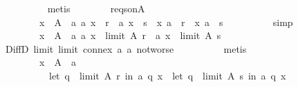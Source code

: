 \begin{isabellebody}
\ \ \ \ \ \ \ \ \isamarkupfalse%
\ metis\isanewline
\ \ \ \ \ \ \isamarkupfalse%
\ r{\isacharunderscore}{\kern0pt}eq{\isacharunderscore}{\kern0pt}s{\isacharunderscore}{\kern0pt}on{\isacharunderscore}{\kern0pt}A{\isacharunderscore}{\kern0pt}{}{\isacharcolon}{\kern0pt}\isanewline
\ \ \ \ \ \ \ \ {\isachardoublequoteopen}{\isasymforall}x\ {\isasymin}\ A\ {\isacharminus}{\kern0pt}\ {\isacharbraceleft}{\kern0pt}a{\isacharbraceright}{\kern0pt}{\isachardot}{\kern0pt}\ {\isacharparenleft}{\kern0pt}{\isacharparenleft}{\kern0pt}a{\isacharcomma}{\kern0pt}\ x{\isacharparenright}{\kern0pt}\ {\isasymin}\ r\ {\isasymand}\ {\isacharparenleft}{\kern0pt}a{\isacharcomma}{\kern0pt}\ x{\isacharparenright}{\kern0pt}\ {\isasymin}\ s{\isacharparenright}{\kern0pt}\ {\isasymor}\ {\isacharparenleft}{\kern0pt}{\isacharparenleft}{\kern0pt}x{\isacharcomma}{\kern0pt}\ a{\isacharparenright}{\kern0pt}\ {\isasymin}\ r\ {\isasymand}\ {\isacharparenleft}{\kern0pt}x{\isacharcomma}{\kern0pt}\ a{\isacharparenright}{\kern0pt}\ {\isasymin}\ s{\isacharparenright}{\kern0pt}{\isachardoublequoteclose}\isanewline
\ \ \ \ \ \ \ \ \isamarkupfalse%
\ simp\isanewline
\ \ \ \ \ \ \isamarkupfalse%
\isanewline
\ \ \ \ \ \ \ \ {\isachardoublequoteopen}{\isasymforall}x\ {\isasymin}\ A\ {\isacharminus}{\kern0pt}\ {\isacharbraceleft}{\kern0pt}a{\isacharbraceright}{\kern0pt}{\isachardot}{\kern0pt}\ {\isacharparenleft}{\kern0pt}a{\isacharcomma}{\kern0pt}\ x{\isacharparenright}{\kern0pt}\ {\isasymin}\ {\isacharparenleft}{\kern0pt}limit\ A\ r{\isacharparenright}{\kern0pt}\ {\isasymlongleftrightarrow}\ {\isacharparenleft}{\kern0pt}a{\isacharcomma}{\kern0pt}\ x{\isacharparenright}{\kern0pt}\ {\isasymin}\ {\isacharparenleft}{\kern0pt}limit\ A\ s{\isacharparenright}{\kern0pt}{\isachardoublequoteclose}\isanewline
\ \ \ \ \ \ \ \ \isamarkupfalse%
\ DiffD{}\ limit{}\ limit{}\ connex{}\ a{}\ a{}{\isacharunderscore}{\kern0pt}{}\ not{\isacharunderscore}{\kern0pt}worse\isanewline
\ \ \ \ \ \ \ \ \isamarkupfalse%
\ metis\isanewline
\ \ \ \ \ \ \isamarkupfalse%
\isanewline
\ \ \ \ \ \ \ \ {\isachardoublequoteopen}{\isasymforall}x\ {\isasymin}\ A\ {\isacharminus}{\kern0pt}\ {\isacharbraceleft}{\kern0pt}a{\isacharbraceright}{\kern0pt}{\isachardot}{\kern0pt}\isanewline
\ \ \ \ \ \ \ \ \ \ {\isacharparenleft}{\kern0pt}let\ q\ {\isacharequal}{\kern0pt}\ limit\ A\ r\ in\ a\ {\isasympreceq}\isactrlsub q\ x{\isacharparenright}{\kern0pt}\ {\isasymlongleftrightarrow}\ {\isacharparenleft}{\kern0pt}let\ q\ {\isacharequal}{\kern0pt}\ limit\ A\ s\ in\ a\ {\isasympreceq}\isactrlsub q\ x{\isacharparenright}{\kern0pt}{\isachardoublequoteclose}\isanewline

\end{isabellebody}
